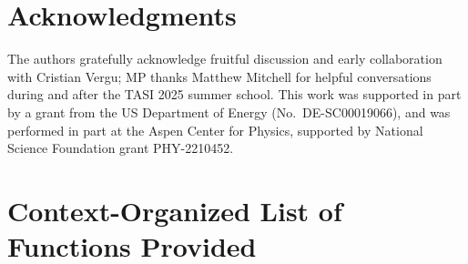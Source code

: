 \documentclass[12pt,a4paper]{article}\let\ifpdf\relax
\makeatletter
\renewcommand{\@seccntformat}[1]{\csname the#1\endcsname.\;}%
\makeatother
\begin{document}
\section*{Acknowledgments}%
\vspace{-4pt}
\noindent The authors gratefully acknowledge fruitful discussion and early collaboration with Cristian Vergu; MP thanks Matthew Mitchell for helpful conversations during and after the TASI 2025 summer school. This work was supported in part by a grant from the US Department of Energy (No.\ DE-SC00019066), and was performed in part at the Aspen Center for Physics, supported by National Science Foundation grant PHY-2210452.





\newpage
{}
\appendix
%
\setcounter{section}{-1}
\renewcommand{\@seccntformat}[1]{\csname the #1\endcsname\;}
%
\hypertarget{context_organization_of_appendix}{}
\vspace{-0pt}\section[\mbox{\hspace{-18pt}Context-Organized List of Functions Provided by the Package}]{\hspace{-5.2pt}Context-Organized List of Functions Provided}%
\vspace{-4pt}
\renewcommand{\@seccntformat}[1]{\csname the#1\endcsname.\;}

\vspace{-4pt}\vspace{-4pt}

\vspace{-0pt}\vspace{-4pt}
\end{document}
